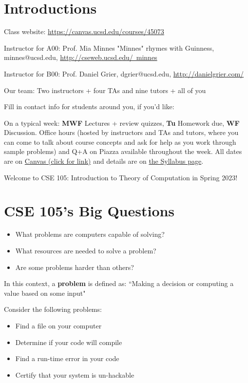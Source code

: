 \newpage

\section*{Introductions}
Class website: \href{https://canvas.ucsd.edu/courses/45073}{https://canvas.ucsd.edu/courses/45073}


Instructor for A00: Prof. Mia Minnes {\tiny{"Minnes" rhymes with Guinness}}, minnes@ucsd.edu, 
\href{http://cseweb.ucsd.edu/~minnes}{http://cseweb.ucsd.edu/~minnes}

Instructor for B00: Prof. Daniel Grier, dgrier@ucsd.edu, \href{http://danielgrier.com/}{http://danielgrier.com/}

Our team: Two instructors + four TAs and nine tutors + all of you

Fill in contact info for students around you, if you'd like:

\vfill


On a typical week: {\bf MWF} Lectures + review quizzes, {\bf Tu} Homework due, {\bf WF} Discussion.
Office hours (hosted by instructors and TAs and tutors, where you can come to talk 
about course concepts and ask for help as you work through sample problems) and Q+A on Piazza available throughout the week.
All dates are on \href{https://canvas.ucsd.edu/}{Canvas (click for link)} and details are on
 \href{https://canvas.ucsd.edu/courses/45073}{the Syllabus page}.

\newpage Welcome to CSE 105: Introduction to Theory of Computation in Spring 2023!

\section*{CSE 105's Big Questions}
\begin{itemize}
   \item What problems are computers capable of solving?
   \item What resources are needed to solve a problem?
   \item Are some problems harder than others?
\end{itemize}

In this context, a {\bf problem} is defined as: ``Making a decision or computing a value based on some input"

Consider the following problems: 
\begin{itemize}
   \item Find a file on your computer
   \item Determine if your code will compile
   \item Find a run-time error in your code
   \item Certify that your system is un-hackable
\end{itemize}

